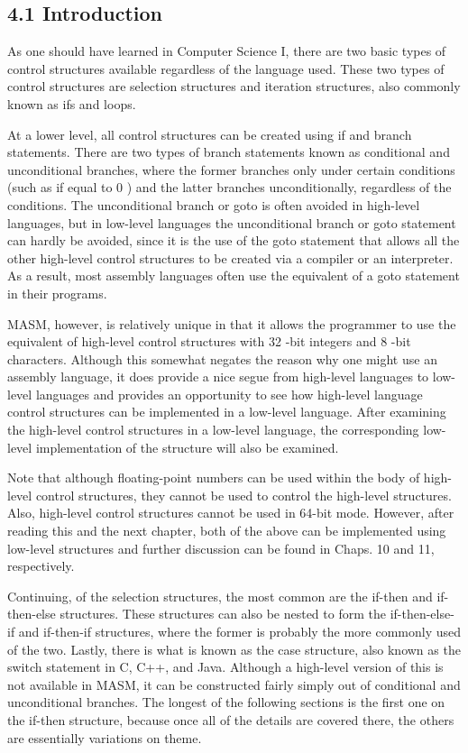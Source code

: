 \documentclass[10pt]{book}
\begin{document}
\subsection*{4.1 Introduction}
As one should have learned in Computer Science I, there are two basic types of control structures available regardless of the language used. These two types of control structures are selection structures and iteration structures, also commonly known as ifs and loops.


At a lower level, all control structures can be created using if and branch statements. There are two types of branch statements known as conditional and unconditional branches, where the former branches only under certain conditions (such as if equal to 0 ) and the latter branches unconditionally, regardless of the conditions. The unconditional branch or goto is often avoided in high-level languages, but in low-level languages the unconditional branch or goto statement can hardly be avoided, since it is the use of the goto statement that allows all the other high-level control structures to be created via a compiler or an interpreter. As a result, most assembly languages often use the equivalent of a goto statement in their programs.

MASM, however, is relatively unique in that it allows the programmer to use the equivalent of high-level control structures with 32 -bit integers and 8 -bit characters. Although this somewhat negates the reason why one might use an assembly language, it does provide a nice segue from high-level languages to low-level languages and provides an opportunity to see how high-level language control structures can be implemented in a low-level language. After examining the high-level control structures in a low-level language, the corresponding low-level implementation of the structure will also be examined.

Note that although floating-point numbers can be used within the body of high-level control structures, they cannot be used to control the high-level structures. Also, high-level control structures cannot be used in 64-bit mode. However, after reading this and the next chapter, both of the above can be implemented using low-level structures and further discussion can be found in Chaps. 10 and 11, respectively.

Continuing, of the selection structures, the most common are the if-then and if-then-else structures. These structures can also be nested to form the if-then-else-if and if-then-if structures, where the former is probably the more commonly used of the two. Lastly, there is what is known as the case structure, also known as the switch statement in C, C++, and Java. Although a high-level version of this is not available in MASM, it can be constructed fairly simply out of conditional and unconditional branches. The longest of the following sections is the first one on the if-then structure, because once all of the details are covered there, the others are essentially variations on theme.
\end{document}
